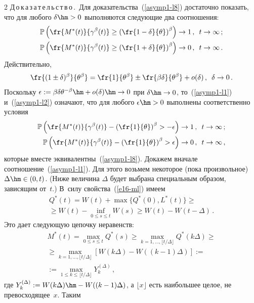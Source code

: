 \begin{multicols}{2}
\noindent
Д\,о\,к\,а\,з\,а\,т\,е\,л\,ь\,с\,т\,в\,о\,.\
Для доказательства~(\ref{asymp1-l8}) достаточно показать, что для
любого $\delta\hm>0$ выполняются следующие два соотношения:
\begin{align}
\mathbb{P} \left( \fr{M^*(t)}{\gamma^\beta(t)} \geq \left(
\fr{1-\delta}{\theta} \right)^\beta \right ) & \to 1\,,\enskip t \to
\infty \,; \label{asymp1-l1}\\
\mathbb{P} \left( \fr{M^*(t)}{\gamma^\beta(t)} \geq \left(
\fr{1+\delta}{\theta} \right)^\beta \right) &\to 0\,,\enskip t \to
\infty\,. \label{asymp1-l2}
\end{align}
Действительно,
$$
\fr{(1\pm \delta)^\beta}{{\theta}^\beta}=\fr{1}{{\theta}^\beta}\pm
\fr{\beta \delta}{{\theta}^\beta}+o(\delta)\,,\enskip  \delta \to 0\,.
$$
Поскольку $\epsilon :=\beta \delta\theta^{-\beta}\hm+o(\delta)\hm\to 0$   
при  $\delta\hm\to 0$, то~(\ref{asymp1-l1}) и~(\ref{asymp1-l2})
означают, что для любого $\epsilon\hm>0$ выполнены соответственно условия
\begin{align*}
\mathbb{P} \left(\fr{M^*(t)}{\gamma^\beta(t)}-\left(
\fr{1}{\theta}\right)^\beta > -\epsilon \right ) & \to 1\,,\enskip t \to \infty\,;\\
\mathbb{P} \left(\fr{M^*(t)}{\gamma^\beta(t)}-\left(
\fr{1}{\theta}\right)^\beta > \epsilon \right ) &\to 0\,,\enskip t \to \infty\,,
\end{align*}
которые вместе эквивалентны~(\ref{asymp1-l8}). Докажем вначале
соотношение~(\ref{asymp1-l1}). Для этого возьмем некоторое (пока
произвольное) $\Delta \hm\in (0,t)$. (Ниже величина $\Delta$ будет
выбрана специальным образом, зависящим от~$t$.) В~силу свойства~(\ref{e16-ml}) имеем
\begin{multline}
Q^*(t)=W(t)+\max\{Q^*(0), L^*(t)\}\geq{}\\
{}\geq W(t) - \inf_{0 \leq s \leq t} W(s)\geq W(t)-W(t-\Delta)\,.
\label{e18a-ml}
\end{multline}
Это дает  следующую цепочку неравенств:
\begin{multline*}
M^*(t)= \max\limits_{0 \leq s \leq t} Q^*(s)
\geq \max\limits_{k=1,\ldots,\lfloor t/\Delta \rfloor} Q^*(k \Delta)\geq{}\\
{}\geq \max\limits_{k=1,\ldots,\lfloor t/\Delta \rfloor}
[W(k\Delta)-W((k-1)\Delta)]:={}\\
{}:=\max\limits_{1\leq k \leq \lfloor t/\Delta \rfloor}Y_k^{(\Delta)}\,,
\end{multline*}
где $Y_k^{(\Delta)}:=W(k\Delta)\hm-W((k-1)\Delta)$, а $\lfloor x
\rfloor$ есть  наибольшее целое, не превосходящее~$x$. Таким

\end{multicols}
